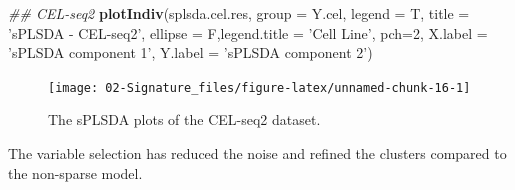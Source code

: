 \documentclass[]{book}
\newenvironment{Shaded}{\begin{snugshade}}{\end{snugshade}}
\newcommand{\CommentTok}[1]{\textcolor[rgb]{0.56,0.35,0.01}{\textit{#1}}}
\newcommand{\DataTypeTok}[1]{\textcolor[rgb]{0.13,0.29,0.53}{#1}}
\newcommand{\DecValTok}[1]{\textcolor[rgb]{0.00,0.00,0.81}{#1}}
\newcommand{\FloatTok}[1]{\textcolor[rgb]{0.00,0.00,0.81}{#1}}
\newcommand{\KeywordTok}[1]{\textcolor[rgb]{0.13,0.29,0.53}{\textbf{#1}}}
\newcommand{\NormalTok}[1]{#1}
\newcommand{\OperatorTok}[1]{\textcolor[rgb]{0.81,0.36,0.00}{\textbf{#1}}}
\newcommand{\StringTok}[1]{\textcolor[rgb]{0.31,0.60,0.02}{#1}}
\theoremstyle{definition}
\theoremstyle{definition}
\theoremstyle{definition}
\theoremstyle{remark}
\begin{document}
\begin{Shaded}
\begin{Highlighting}[]
\CommentTok{## CEL-seq2}
\KeywordTok{plotIndiv}\NormalTok{(splsda.cel.res, }\DataTypeTok{group =}\NormalTok{ Y.cel,}
          \DataTypeTok{legend  =}\NormalTok{ T, }\DataTypeTok{title     =} \StringTok{'sPLSDA - CEL-seq2'}\NormalTok{,}
          \DataTypeTok{ellipse =}\NormalTok{ F,}\DataTypeTok{legend.title =} \StringTok{'Cell Line'}\NormalTok{,}
          \DataTypeTok{pch=}\DecValTok{2}\NormalTok{,}
          \DataTypeTok{X.label =} \StringTok{'sPLSDA component 1'}\NormalTok{,}
          \DataTypeTok{Y.label =} \StringTok{'sPLSDA component 2'}\NormalTok{)}
\end{Highlighting}
\end{Shaded}

\begin{figure}[ht]

{\centering \texttt{[image: 02-Signature\_files/figure-latex/unnamed-chunk-16-1]} 

}

\caption{ The sPLSDA plots of the CEL-seq2 dataset.}\label{fig:unnamed-chunk-16}
\end{figure}

The variable selection has reduced the noise and refined the clusters
compared to the non-sparse model.

\begin{Shaded}
\end{Shaded}
\end{document}

